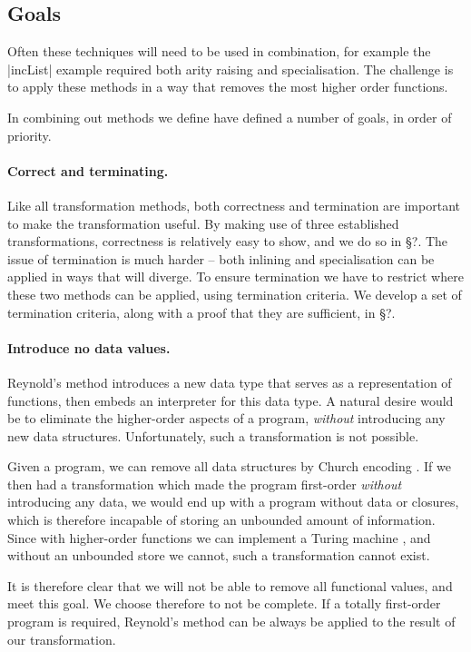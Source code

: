 \documentclass[preprint]{sigplanconf}
\begin{document}
\subsection{Goals}

Often these techniques will need to be used in combination, for example the |incList| example required both arity raising and specialisation. The challenge is to apply these methods in a way that removes the most higher order functions. 

In combining out methods we define have defined a number of goals, in order of priority.

\paragraph{Correct and terminating.} Like all transformation methods, both correctness and termination are important to make the transformation useful. By making use of three established transformations, correctness is relatively easy to show, and we do so in \S?. The issue of termination is much harder -- both inlining and specialisation can be applied in ways that will diverge. To ensure termination we have to restrict where these two methods can be applied, using termination criteria. We develop a set of termination criteria, along with a proof that they are sufficient, in \S?.

\paragraph{Introduce no data values.} Reynold's method introduces a new data type that serves as a representation of functions, then embeds an interpreter for this data type. A natural desire would be to eliminate the higher-order aspects of a program, \textit{without} introducing any new data structures. Unfortunately, such a transformation is not possible.

Given a program, we can remove all data structures by Church encoding \cite{church_encode}. If we then had a transformation which made the program first-order \textit{without} introducing any data, we would end up with a program without data or closures, which is therefore incapable of storing an unbounded amount of information. Since with higher-order functions we can implement a Turing machine \cite{turing:halting}, and without an unbounded store we cannot, such a transformation cannot exist.

It is therefore clear that we will not be able to remove all functional values, and meet this goal. We choose therefore to not be complete. If a totally first-order program is required, Reynold's method can be always be applied to the result of our transformation.
\end{document}
